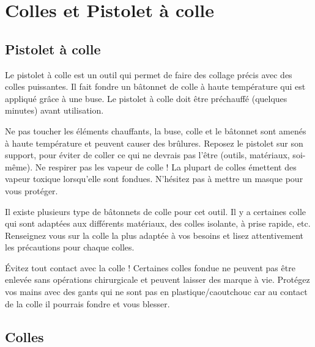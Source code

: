 \section*{Colles et Pistolet à colle}
\subsection*{Pistolet à colle}
Le pistolet à colle est un outil qui permet de faire des collage précis avec des colles puissantes. Il fait fondre un bâtonnet de colle à haute température qui est appliqué grâce à une buse. Le pistolet à colle doit être préchauffé (quelques minutes) avant utilisation.

Ne pas toucher les éléments chauffants, la buse, colle et le bâtonnet sont amenés à haute température et peuvent causer des brûlures. Reposez le pistolet sur son support, pour éviter de coller ce qui ne devrais pas l'être (outils, matériaux, soi-même). Ne respirer pas les vapeur de colle ! La plupart de colles émettent des vapeur toxique lorsqu'elle sont fondues. N'hésitez pas à mettre un masque pour vous protéger.

Il existe plusieurs type de bâtonnets de colle pour cet outil. Il y a certaines colle qui sont adaptées aux différents matériaux, des colles isolante, à prise rapide, etc. Renseignez vous sur la colle la plus adaptée à vos besoins et lisez attentivement les précautions pour chaque colles.

Évitez tout contact avec la colle ! Certaines colles fondue ne peuvent pas être enlevée sans opérations chirurgicale et peuvent laisser des marque à vie. Protégez vos mains avec des gants qui ne sont pas en plastique/caoutchouc car au contact de la colle il pourrais fondre et vous blesser.

\subsection*{Colles}
